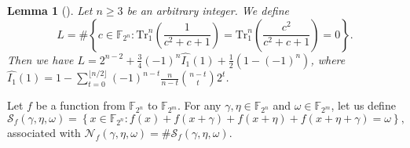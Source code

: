 \documentclass{article}
\newcommand{\F}{\mathbb{F}}
\newcommand{\0}{\textbf{0}}
\newcommand{\1}{\textbf{1}}
\theoremstyle{plain}
\newtheorem{lemma}{Lemma}
\begin{document}



    \begin{lemma}[\cite{tang2022invfunc}]\label{L:SumInv00}
        Let $n\geq 3$ be an arbitrary integer. We define
        $$L=\#\left\{c\in\F_{2^n} : \mathrm{Tr}_1^n\left(\frac{1}{c^2+c+1}\right)=\mathrm{Tr}_1^n\left(\frac{c^2}{c^2+c+1}\right)=0\right\}.$$
        Then we have $L=2^{n-2}+\frac{3}{4}(-1)^n\widehat{I_1}(1)+\frac{1}{2}\left(1-(-1)^n\right)$, where $ \widehat{I_1}(1)=1-\sum_{t=0}^{\lfloor n/2\rfloor}(-1)^{n-t}\frac{n}{n-t}{{n-t}\choose {t}}2^t $.
    \end{lemma}

    Let $ f $ be a function from $ \F_{2^n} $ to $ \F_{2^m} $. For any $ \gamma,\eta\in\F_{2^n} $ and $ \omega\in\F_{2^m} $, let us define
    \[\mathcal{S}_f(\gamma,\eta,\omega)=\left\{x\in\F_{2^n} : f(x)+f(x+\gamma)+f(x+\eta)+f(x+\eta+\gamma)=\omega\right\},\] 
    associated with $ \mathcal{N}_f(\gamma,\eta,\omega)=\#\mathcal{S}_f(\gamma,\eta,\omega) $. 
\end{document}
